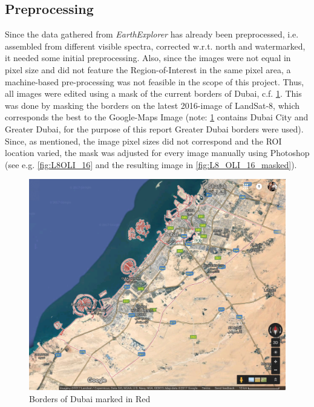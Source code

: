 \subsection{Preprocessing}
Since the data gathered from \textit{EarthExplorer} has already been preprocessed, i.e. assembled from different visible spectra, corrected w.r.t. north and watermarked, it needed some initial preprocessing. Also, since the images were not equal in pixel size and did not feature the Region-of-Interest in the same pixel area, a machine-based pre-processing was not feasible in the scope of this project. Thus, all images were edited using a mask of the current borders of Dubai, c.f. \cref{fig:borders}. This was done by masking the borders on the latest 2016-image of LandSat-8, which corresponds the best to the Google-Maps Image (note: \cref{fig:borders} contains Dubai City and Greater Dubai, for the purpose of this report Greater Dubai borders were used). Since, as mentioned, the image pixel sizes did not correspond and the ROI location varied, the mask was adjusted for every image manually using Photoshop (see e.g. \cref{fig:L8OLI_16} and the resulting image in \cref{fig:L8_OLI_16_masked}).
\begin{figure}[h!]
	\centering
	\includegraphics[width=\textwidth]{images/google_dubai.png}
	\caption{Borders of Dubai marked in Red\protect\footnotemark}
	\label{fig:borders}
\end{figure}

